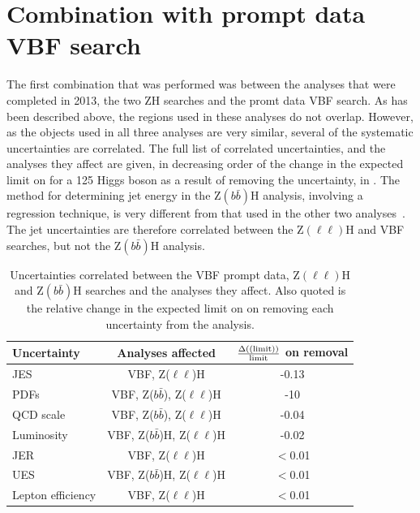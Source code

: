 \section{Combination with prompt data VBF search}
\label{sec:combprompt}
The first combination that was performed was between the analyses that were completed in 2013, the two ZH searches and the promt data \ac{VBF} search. As has been described above, the regions used in these analyses do not overlap. However, as the objects used in all three analyses are very similar, several of the systematic uncertainties are correlated. The full list of correlated uncertainties, and the analyses they affect are given, in decreasing order of the change in the expected limit on \BRinv for a 125 \GeV Higgs boson as a result of removing the uncertainty, in . The method for determining jet energy in the Z$(b\bar{b})$H analysis, involving a regression technique, is very different from that used in the other two analyses~\cite{CMS-PAS-HIG-13-028}. The jet uncertainties are therefore correlated between the Z$(\ell\ell)$H and \ac{VBF} searches, but not the Z$(b\bar{b})$H analysis.

\begin{table}
  \caption{Uncertainties correlated between the \ac{VBF} prompt data, Z$(\ell\ell)$H and Z$(b\bar{b})$H searches and the analyses they affect. Also quoted is the relative change in the expected limit on \BRinv on removing each uncertainty from the analysis.}
  \label{tab:promptcorrs}
  \begin{tabular}{lcc}
    \hline
    \hline
    Uncertainty & Analyses affected & $\frac{\Delta(\rm(limit))}{\rm{limit}}$ on removal \\
    \hline
    \ac{JES} & VBF, Z($\ell\ell$)H & -0.13 \\
    PDFs & VBF, Z($b\bar{b}$), Z($\ell\ell$)H & -10 \\
    QCD scale & VBF, Z($b\bar{b}$), Z($\ell\ell$)H & -0.04\\
    Luminosity & VBF, Z($b\bar{b}$)H, Z($\ell\ell$)H & -0.02\\
    \ac{JER} & VBF, Z($\ell\ell$)H & $<$0.01\\
    \ac{UES} & VBF, Z($b\bar{b}$)H, Z($\ell\ell$)H & $<$0.01\\
    Lepton efficiency & VBF, Z($\ell\ell$)H & $<$0.01\\
    \hline
    \hline
  \end{tabular}
\end{table}

